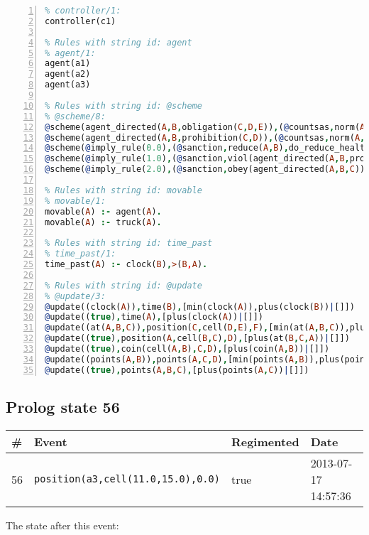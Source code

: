 \documentclass[11pt]{article}\usepackage[utf8]{inputenc}\usepackage{geometry}
\begin{document}
\begin{lstlisting}[language=Prolog, numbers=left]
% Rules with string id: controller
% controller/1:
controller(c1)

% Rules with string id: agent
% agent/1:
agent(a1)
agent(a2)
agent(a3)

% Rules with string id: @scheme
% @scheme/8:
@scheme(agent_directed(A,B,obligation(C,D,E)),(@countsas,norm(A,B,F,obligation(C,D,E)),F),false,(listTrue(C)),(time_past(D)),false,[plus(viol(agent_directed(A,B,obligation(C,D,E))))|[]],[plus(obey(agent_directed(A,B,obligation(C,D,E))))|[]])
@scheme(agent_directed(A,B,prohibition(C,D)),(@countsas,norm(A,B,E,prohibition(C,D)),E),(listTrue(C)),false,(false),false,[plus(viol(agent_directed(A,B,prohibition(C,D))))|[]],[plus(obey(agent_directed(A,B,prohibition(C,D))))|[]])
@scheme(@imply_rule(0.0),(@sanction,reduce(A,B),do_reduce_health(A,B),notifyAgent(A,changed(status))),true,false,false,false,[min(reduce(A,B))|[]],[])
@scheme(@imply_rule(1.0),(@sanction,viol(agent_directed(A,B,prohibition(C,D))),do_sanction(D)),true,false,false,false,[min(viol(agent_directed(A,B,prohibition(C,D))))|[]],[])
@scheme(@imply_rule(2.0),(@sanction,obey(agent_directed(A,B,C))),true,false,false,false,[min(obey(agent_directed(A,B,C)))|[]],[])

% Rules with string id: movable
% movable/1:
movable(A) :- agent(A).
movable(A) :- truck(A).

% Rules with string id: time_past
% time_past/1:
time_past(A) :- clock(B),>(B,A).

% Rules with string id: @update
% @update/3:
@update((clock(A)),time(B),[min(clock(A)),plus(clock(B))|[]])
@update((true),time(A),[plus(clock(A))|[]])
@update((at(A,B,C)),position(C,cell(D,E),F),[min(at(A,B,C)),plus(at(D,E,C))|[]])
@update((true),position(A,cell(B,C),D),[plus(at(B,C,A))|[]])
@update((true),coin(cell(A,B),C,D),[plus(coin(A,B))|[]])
@update((points(A,B)),points(A,C,D),[min(points(A,B)),plus(points(A,D))|[]])
@update((true),points(A,B,C),[plus(points(A,C))|[]])

\end{lstlisting}
\clearpage 
\subsection{Prolog state 56}
\begin{table}[ht]
\centering 
\begin{tabular}{l l l l} 
\textbf{\#} & \textbf{Event} & \textbf{Regimented} & \textbf{Date} \\ [0.5ex] 
\hline
56&\texttt{position(a3,cell(11.0,15.0),0.0)}&true&2013-07-17 14:57:36\\ [1ex] \hline\end{tabular}
\end{table}
The state after this event:
\end{document}
